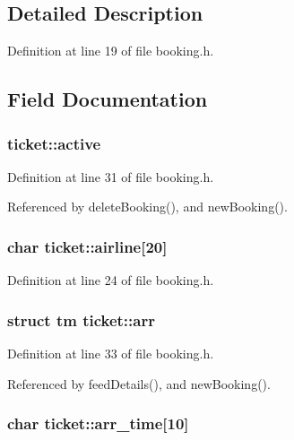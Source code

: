 \subsection{Detailed Description}


Definition at line 19 of file booking.\+h.



\subsection{Field Documentation}
\hypertarget{structticket_a823f183077ae42b41a4f00941da72430}{
\subsubsection[{active}]{ ticket\+::active}}\label{structticket_a823f183077ae42b41a4f00941da72430}


Definition at line 31 of file booking.\+h.



Referenced by delete\+Booking(), and new\+Booking().

\hypertarget{structticket_a3acb4e05ce192acb1ef223ec62891725}{
\subsubsection[{airline}]{\setlength{\rightskip}{0pt plus 5cm}char ticket\+::airline\mbox{[}20\mbox{]}}}\label{structticket_a3acb4e05ce192acb1ef223ec62891725}


Definition at line 24 of file booking.\+h.

\hypertarget{structticket_a7316ad33eb22844503746b7542bb2903}{
\subsubsection[{arr}]{\setlength{\rightskip}{0pt plus 5cm}struct tm ticket\+::arr}}\label{structticket_a7316ad33eb22844503746b7542bb2903}


Definition at line 33 of file booking.\+h.



Referenced by feed\+Details(), and new\+Booking().

\hypertarget{structticket_af7a1201bf0b204f2be1f257b2c0bde68}{
\subsubsection[{arr\+\_\+time}]{\setlength{\rightskip}{0pt plus 5cm}char ticket\+::arr\+\_\+time\mbox{[}10\mbox{]}}}\label{structticket_af7a1201bf0b204f2be1f257b2c0bde68}


